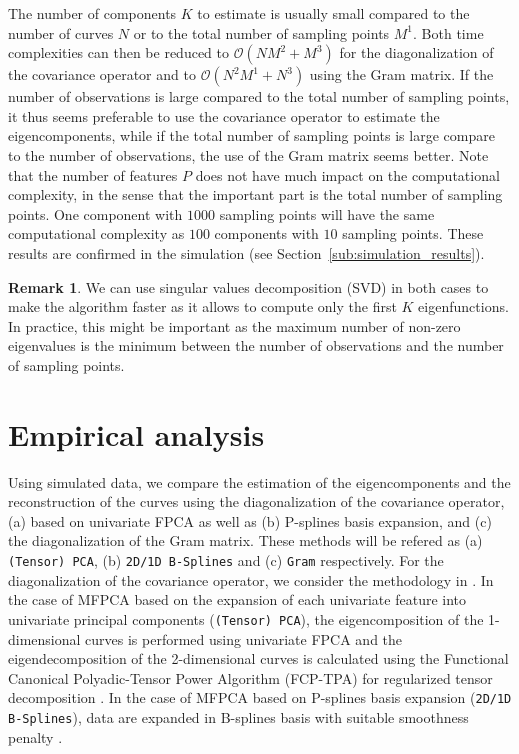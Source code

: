 \documentclass[times,sort&compress,3p]{elsarticle}
\theoremstyle{plain}%
\theoremstyle{definition}
\newtheorem{remark}{Remark}
\begin{document}
The number of components $K$ to estimate is usually small compared to the number of curves $N$ or to the total number of sampling points $M^1$. Both time complexities can then be reduced to $\mathcal{O}(NM^2 + M^3)$ for the diagonalization of the covariance operator and to $\mathcal{O}(N^2M^1 + N^3)$ using the Gram matrix. If the number of observations is large compared to the total number of sampling points, it thus seems preferable to use the covariance operator to estimate the eigencomponents, while if the total number of sampling points is large compare to the number of observations, the use of the Gram matrix seems better. Note that the number of features $P$ does not have much impact on the computational complexity, in the sense that the important part is the total number of sampling points. One component with $1000$ sampling points will have the same computational complexity as $100$ components with $10$ sampling points. These results are confirmed in the simulation (see Section~\ref{sub:simulation_results}).

\begin{remark}
We can use singular values decomposition (SVD) in both cases to make the algorithm faster as it allows to compute only the first $K$ eigenfunctions. In practice, this might be important as the maximum number of non-zero eigenvalues is the minimum between the number of observations and the number of sampling points.
\end{remark}



\section{Empirical analysis} %
\label{sec:empirical_analysis}


Using simulated data, we compare the estimation of the eigencomponents and the reconstruction of the curves using the diagonalization of the covariance operator, (a) based on univariate FPCA as well as (b) P-splines basis expansion, and (c) the diagonalization of the Gram matrix. These methods will be refered as (a) \texttt{(Tensor) PCA}, (b) \texttt{2D/1D B-Splines} and (c) \texttt{Gram} respectively. For the diagonalization of the covariance operator, we consider the methodology in \cite{happMultivariateFunctionalPrincipal2018a}. In the case of MFPCA based on the expansion of each univariate feature into univariate principal components (\texttt{(Tensor) PCA}), the eigencomposition of the 1-dimensional curves is performed using univariate FPCA and the eigendecomposition of the 2-dimensional curves is calculated using the Functional Canonical Polyadic-Tensor Power Algorithm (FCP-TPA) for regularized tensor decomposition \citep{allenMultiwayFunctionalPrincipal2013a}. In the case of MFPCA based on P-splines basis expansion (\texttt{2D/1D B-Splines}), data are expanded in B-splines basis with suitable smoothness penalty \citep{eilersFlexibleSmoothingBsplines1996}.
\end{document}

